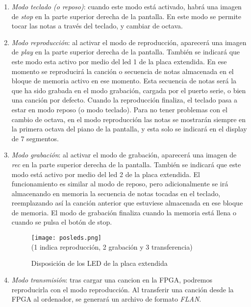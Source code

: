 \documentclass{article}
\begin{document}
	\begin{enumerate}
	\item {\itshape Modo teclado (o reposo)}: cuando este modo está activado, habrá una imagen de {\itshape stop} en la parte superior derecha de la pantalla. En este modo se permite tocar las notas a través del teclado, y cambiar de octava.

	\item {\itshape Modo reproducción}: al activar el modo de reproducción, aparecerá una imagen de {\itshape play} en la parte superior derecha de la pantalla. También se indicará que este modo esta activo por medio del led 1 de la placa extendida. En ese momento se reproducirá la canción o secuencia de notas almacenada en el bloque de memoria activo en ese momento. Esta secuencia de notas será la que ha sido grabada en el modo grabación, cargada por el puerto serie, o bien una canción por defecto. Cuando la reproducción finaliza, el teclado pasa a estar en modo reposo (o modo teclado).  Para no tener problemas con el cambio de octava, en el modo reproducción las notas se mostrarán siempre en la primera octava del piano de la pantalla, y esta solo se indicará en el display de 7 segmentos.

	\item {\itshape Modo grabación}: al activar el modo de grabación, aparecerá una imagen de {\itshape rec} en la parte superior derecha de la pantalla. También se indicará que este modo está activo por medio del led 2 de la placa extendida. El funcionamiento es similar al modo de reposo, pero adicionalmente se irá almacenando en memoria la secuencia de notas tocadas en el teclado, reemplazando así la canción anterior que estuviese almacenada en ese bloque de memoria. El modo de grabación finaliza cuando la memoria está llena o cuando se pulsa el botón de stop.

	\begin{figure}[ht] \centering
	\texttt{[image: posleds.png]} \\
	{\small (1 indica reproducción, 2 grabación y 3 transferencia)}
	\caption{Disposición de los LED de la placa extendida}
	\end{figure}

	\item {\itshape Modo transmisión}: tras cargar una cancion en la FPGA, podremos reproducirla con el modo reproducción. Al transferir una canción desde la FPGA al ordenador, se generará un archivo de formato {\itshape FLAN}.
	\end{enumerate}
	
\end{document}

